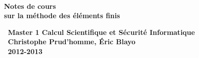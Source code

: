 \thispagestyle{empty}
~\vspace*{7 cm}\\
\begin{center}
{\LARGE\bf Notes de cours\vspace*{10 mm}\\ sur la m\'ethode des \'el\'ements
finis} \vspace*{8 cm}
\end{center}
%
%
{\bf
~\hspace*{\fill}Master 1 Calcul Scientifique et Sécurité Informatique\\
~\hspace*{\fill}Christophe Prud'homme, Éric Blayo\\
~\hspace*{\fill}2012-2013\\
}
%
\newpage
%
~\vspace*{7cm}\\
%



